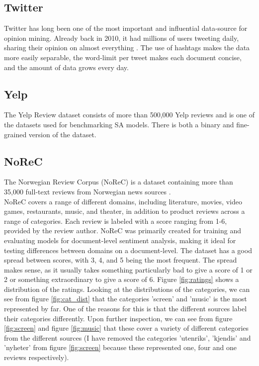 \subsection{Twitter}
Twitter has long been one of the most important and influential data-source for opinion mining. Already back in 2010, it had millions of users tweeting daily, sharing their opinion on almost everything \cite{pak-paroubek-2010-twitter}. The use of hashtags makes the data more easily separable, the word-limit per tweet makes each document concise, and the amount of data grows every day.
\subsection{Yelp} 
The Yelp Review dataset \cite{zhang2016characterlevel} consists of more than 500,000 Yelp reviews and is one of the datasets used for benchmarking SA models. There is both a binary and fine-grained version of the dataset.


\subsection{NoReC}
The Norwegian Review Corpus (NoReC) is a dataset containing more than 35,000 full-text reviews from Norwegian news sources \cite{VelOvrBer18}.\\
NoReC covers a range of different domains, including literature, movies, video games, restaurants, music, and theater, in addition to product reviews across a range of categories. Each review is labeled with a score ranging from 1-6, provided by the review author. NoReC was primarily created for training and evaluating models for document-level sentiment analysis, making it ideal for testing differences between domains on a document-level. The dataset has a good spread between scores, with 3, 4, and 5 being the most frequent. The spread makes sense, as it usually takes something particularly bad to give a score of 1 or 2 or something extraordinary to give a score of 6. Figure \ref{fig:ratings} shows a distribution of the ratings. Looking at the distributions of the categories, we can see from figure \ref{fig:cat_dist} that the categories 'screen' and 'music' is the most represented by far. One of the reasons for this is that the different sources label their categories differently. Upon further inspection, we can see from figure \ref{fig:screen} and figure \ref{fig:music} that these cover a variety of different categories from the different sources (I have removed the categories 'utenriks', 'kjendis' and 'nyheter' from figure \ref{fig:screen} because these represented one, four and one reviews respectively).

